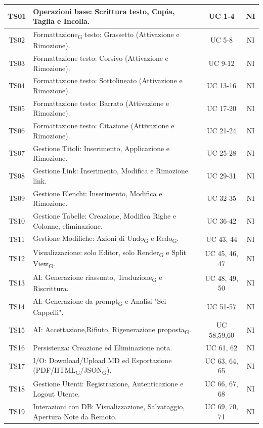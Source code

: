 \begin{xltabular}{\textwidth}{|c|X|c|c|}
    TS01 & Operazioni base: Scrittura testo, Copia, Taglia e Incolla. & UC 1-4 & NI \\ \hline
    TS02 & Formattazione\textsubscript{G} testo: Grassetto (Attivazione e Rimozione). & UC 5-8 & NI \\ \hline
    TS03 & Formattazione testo: Corsivo (Attivazione e Rimozione). & UC 9-12 & NI \\ \hline
    TS04 & Formattazione testo: Sottolineato (Attivazione e Rimozione). & UC 13-16 & NI \\ \hline
    TS05 & Formattazione testo: Barrato (Attivazione e Rimozione). & UC 17-20 & NI \\ \hline
    TS06 & Formattazione testo: Citazione (Attivazione e Rimozione). & UC 21-24 & NI \\ \hline
    TS07 & Gestione Titoli: Inserimento, Applicazione e Rimozione. & UC 25-28 & NI \\ \hline
    TS08 & Gestione Link: Inserimento, Modifica e Rimozione link. & UC 29-31 & NI \\ \hline
    TS09 & Gestione Elenchi: Inserimento, Modifica e Rimozione. & UC 32-35 & NI \\ \hline
    TS10 & Gestione Tabelle: Creazione, Modifica Righe e Colonne, eliminazione. & UC 36-42 & NI \\ \hline
    TS11 & Gestione Modifiche: Azioni di Undo\textsubscript{G} e Redo\textsubscript{G}. & UC 43, 44 & NI \\ \hline
    TS12 & Visualizzazione: solo Editor, solo Render\textsubscript{G} e Split View\textsubscript{G}. & UC 45, 46, 47 & NI \\ \hline
    TS13 & AI: Generazione riassunto, Traduzione\textsubscript{G} e Riscrittura. & UC 48, 49, 50 & NI \\ \hline
    TS14 & AI: Generazione da prompt\textsubscript{G} e Analisi "Sei Cappelli". & UC 51-57 & NI \\ \hline
    TS15 & AI: Accettazione,Rifiuto, Rigenerazione proposta\textsubscript{G}. & UC 58,59,60 & NI \\ \hline
    TS16 & Persistenza: Creazione ed Eliminazione nota. & UC 61, 62 & NI \\ \hline
    TS17 & I/O: Download/Upload MD ed Esportazione (PDF/HTML\textsubscript{G}/JSON\textsubscript{G}). & UC 63, 64, 65 & NI \\ \hline
    TS18 & Gestione Utenti: Registrazione, Autenticazione e Logout Utente. & UC 66, 67, 68 & NI \\ \hline
    TS19 & Interazioni con DB: Visualizzazione, Salvataggio, Apertura Note da Remoto. & UC 69, 70, 71 & NI \\ \hline
\end{xltabular}

